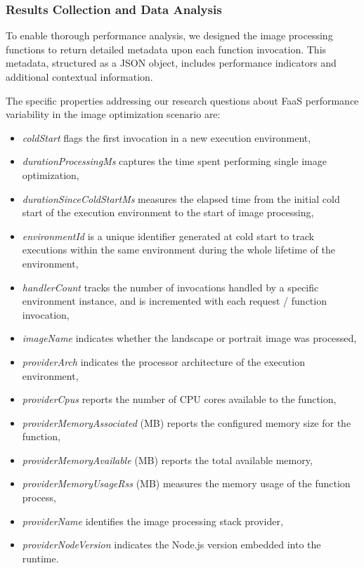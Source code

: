 \subsubsection{Results Collection and Data Analysis}
\label{sec:results-collection-data-analysis}

To enable thorough performance analysis, we designed the image processing functions to return detailed metadata upon each function invocation. This metadata, structured as a JSON object, includes performance indicators and additional contextual information.

The specific properties addressing our research questions about FaaS performance variability in the image optimization scenario are:
\begin{itemize}
  \item \emph{coldStart} flags the first invocation in a new execution environment,
  \item \emph{durationProcessingMs} captures the time spent performing single image optimization,
  \item \emph{durationSinceColdStartMs} measures the elapsed time from the initial cold start of the execution environment to the start of image processing,
  \item \emph{environmentId} is a unique identifier generated at cold start to track executions within the same environment during the whole lifetime of the environment,
  \item \emph{handlerCount} tracks the number of invocations handled by a specific environment instance, and is incremented with each request / function invocation,
  \item \emph{imageName} indicates whether the landscape or portrait image was processed,
  \item \emph{providerArch} indicates the processor architecture of the execution environment,
  \item \emph{providerCpus} reports the number of CPU cores available to the function,
  \item \emph{providerMemoryAssociated} (MB) reports the configured memory size for the function,
  \item \emph{providerMemoryAvailable} (MB) reports the total available memory,
  \item \emph{providerMemoryUsageRss} (MB) measures the memory usage of the function process,
  \item \emph{providerName} identifies the image processing stack provider,
  \item \emph{providerNodeVersion} indicates the Node.js version embedded into the runtime.
\end{itemize}

